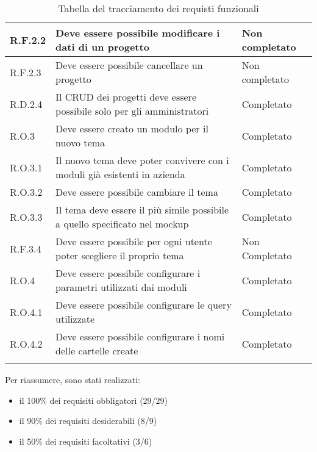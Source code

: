 \begin{longtable}{p{} p{} p{}}
\hline
R.F.2.2    & Deve essere possibile modificare i dati di un progetto & Non completato \\
\hline
R.F.2.3    & Deve essere possibile cancellare un progetto & Non completato \\
\hline
R.D.2.4    & Il CRUD dei progetti deve essere possibile solo per gli amministratori & Completato \\
\hline
R.O.3  & Deve essere creato un modulo per il nuovo tema & Completato \\
\hline
R.O.3.1  & Il nuovo tema deve poter convivere con i moduli già esistenti in azienda & Completato \\
\hline
R.O.3.2  & Deve essere possibile cambiare il tema & Completato \\
\hline
R.O.3.3  & Il tema deve essere il più simile possibile a quello specificato nel mockup & Completato \\
\hline
R.F.3.4  & Deve essere possibile per ogni utente poter scegliere il proprio tema & Non Completato \\
\hline
R.O.4    & Deve essere possibile configurare i parametri utilizzati dai moduli & Completato \\
\hline
R.O.4.1    & Deve essere possibile configurare le query utilizzate & Completato \\
\hline
R.O.4.2    & Deve essere possibile configurare i nomi delle cartelle create & Completato \\
\hline
\caption{Tabella del tracciamento dei requisti funzionali}
\label{tab:requisiti-funzionali}
\end{longtable}
\endgroup

Per riassumere, sono stati realizzati:
\begin{itemize}
\item il 100\% dei requisiti obbligatori (29/29)
\item il  90\% dei requisiti desiderabili (8/9)
\item il 	50\% dei requisiti facoltativi (3/6)
\end{itemize}